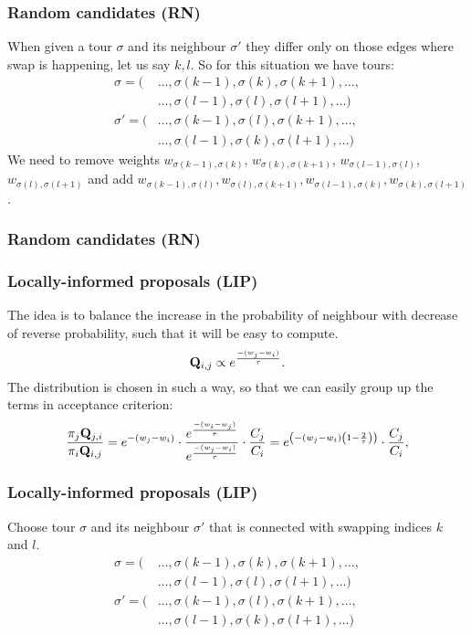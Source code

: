\begin{frame}
	\frametitle{Random candidates (RN)}
	When given a tour $\sigma$ and its neighbour $\sigma'$ they differ only on those edges where swap is happening, let us say $k,l$. So for this situation we have tours:
	\begin{align*}
		\sigma = (&\ldots, \sigma(k-1), \sigma(k), \sigma(k+1), \ldots, \\
		&\ldots, \sigma(l-1), \sigma(l), \sigma(l+1), \ldots) \\
		\sigma' = (&\ldots, \sigma(k-1), \sigma(l), \sigma(k+1), \ldots, \\
		&\ldots, \sigma(l-1), \sigma(k), \sigma(l+1), \ldots)
	\end{align*}
	We need to remove weights $w_{\sigma(k-1), \sigma(k)}$, $w_{\sigma(k), \sigma(k+1)}$, $w_{\sigma(l-1), \sigma(l)}$, $w_{\sigma(l), \sigma(l+1)}$ and add $w_{\sigma(k-1), \sigma(l)}, w_{\sigma(l), \sigma(k+1)}, w_{\sigma(l-1), \sigma(k)}, w_{\sigma(k), \sigma(l+1)}$.
\end{frame}

\begin{frame}
	\frametitle{Random candidates (RN)}
	
\end{frame}

\begin{frame}
	\frametitle{Locally-informed proposals (LIP)}
	The idea is to balance the increase in the probability of neighbour with decrease of reverse probability, such that it will be easy to compute.
	\begin{equation*}
		\mathbf{Q}_{i,j} \propto e^\frac{-(w_{j} - w_i)}{\tau}.
	\end{equation*}
	The distribution is chosen in such a way, so that we can easily group up the terms in acceptance criterion:
	\begin{equation*}
		\frac{\pi_j \mathbf{Q}_{j,i}}{\pi_i \mathbf{Q}_{i,j}} = e^{-(w_j-w_i)} \cdot \frac{e^\frac{-(w_{i} - w_j)}{\tau}}{e^\frac{-(w_{j} - w_i)}{\tau}} \cdot \frac{C_j}{C_i} = e^{\left( -(w_j-w_i) \left(1 - \frac{2}{\tau}\right) \right)} \cdot \frac{C_j}{C_i},
	\end{equation*}
\end{frame}

\begin{frame}
	\frametitle{Locally-informed proposals (LIP)}
	Choose tour $\sigma$ and its neighbour $\sigma'$ that is connected with swapping indices $k$ and $l$.
	\begin{align*}
		\sigma = (&\ldots, \sigma(k-1), \sigma(k), \sigma(k+1), \ldots, \\
		&\ldots, \sigma(l-1), \sigma(l), \sigma(l+1), \ldots) \\
		\sigma' = (&\ldots, \sigma(k-1), \sigma(l), \sigma(k+1), \ldots, \\
		 &\ldots, \sigma(l-1), \sigma(k), \sigma(l+1), \ldots)
	\end{align*}
\end{frame}

